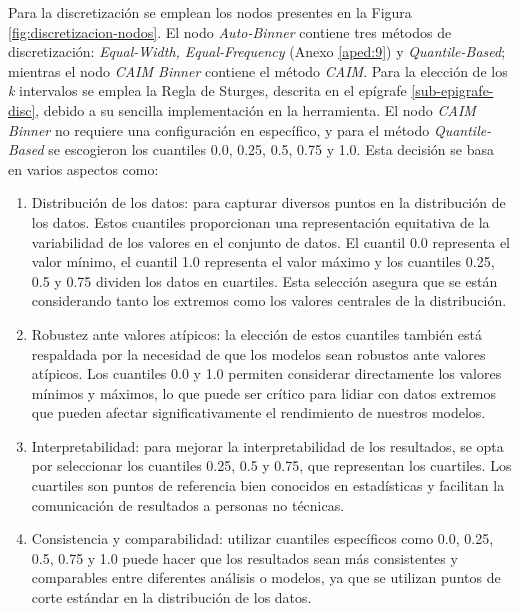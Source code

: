 Para la discretización se emplean los nodos presentes en la Figura \ref{fig:discretizacion-nodos}. El nodo \textit{Auto-Binner} contiene tres métodos de discretización: \textit{Equal-Width, Equal-Frequency} (Anexo \ref{aped:9}) y \textit{Quantile-Based}; mientras el nodo \textit{CAIM Binner} contiene el método \textit{CAIM}. Para la elección de los \textit{k} intervalos se emplea la Regla de Sturges, descrita en el epígrafe \ref{sub-epigrafe-disc}, debido a su sencilla implementación en la herramienta. El nodo \textit{CAIM Binner} no requiere una configuración en específico, y para el método \textit{Quantile-Based} se escogieron los cuantiles 0.0, 0.25, 0.5, 0.75 y 1.0. Esta decisión se basa en varios aspectos como:
\begin{enumerate}
	\item Distribución de los datos: para capturar diversos puntos en la distribución de los datos. Estos cuantiles proporcionan una representación equitativa de la variabilidad de los valores en el conjunto de datos. El cuantil 0.0 representa el valor mínimo, el cuantil 1.0 representa el valor máximo y los cuantiles 0.25, 0.5 y 0.75 dividen los datos en cuartiles. Esta selección asegura que se están considerando tanto los extremos como los valores centrales de la distribución.
	\item Robustez ante valores atípicos: la elección de estos cuantiles también está respaldada por la necesidad de que los modelos sean robustos ante valores atípicos. Los cuantiles 0.0 y 1.0 permiten considerar directamente los valores mínimos y máximos, lo que puede ser crítico para lidiar con datos extremos que pueden afectar significativamente el rendimiento de nuestros modelos.
	\item Interpretabilidad: para mejorar la interpretabilidad de los resultados, se opta por seleccionar los cuantiles 0.25, 0.5 y 0.75, que representan los cuartiles. Los cuartiles son puntos de referencia bien conocidos en estadísticas y facilitan la comunicación de resultados a personas no técnicas. 
	\item Consistencia y comparabilidad: utilizar cuantiles específicos como 0.0, 0.25, 0.5, 0.75 y 1.0 puede hacer que los resultados sean más consistentes y comparables entre diferentes análisis o modelos, ya que se utilizan puntos de corte estándar en la distribución de los datos.
\end{enumerate}

